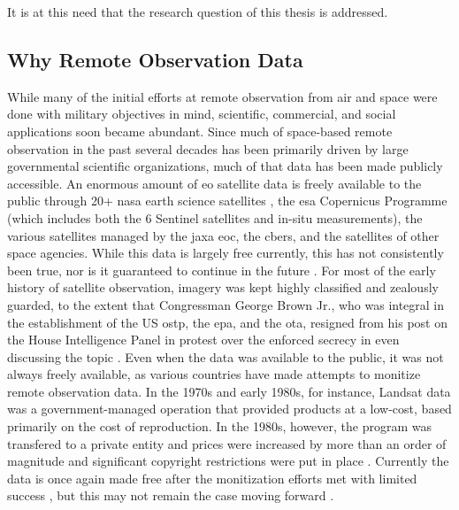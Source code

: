 It is at this need that the research question of this thesis is addressed.


\subsection{Why Remote Observation Data} \label{sec:remote}


While many of the initial efforts at remote observation from air and space were done with military objectives in mind, scientific, commercial, and social applications soon became abundant. Since much of space-based remote observation in the past several decades has been primarily driven by large governmental scientific organizations, much of that data has been made publicly accessible. An enormous amount of \ac{eo} satellite data is freely available to the public through 20+ \ac{nasa} earth science satellites \cite{shirahNASAEarthObserving2017}, the \ac{esa} Copernicus Programme (which includes both the 6 Sentinel satellites and in-situ measurements), the various satellites managed by the \ac{jaxa} \ac{eoc}, the \ac{cbers}, and the satellites of other space agencies. While this data is largely free currently, this has not consistently been true, nor is it guaranteed to continue in the future \cite{borowitzOpenSpaceGlobal2017}. For most of the early history of satellite observation, imagery was kept highly classified and zealously guarded, to the extent that Congressman George Brown Jr., who was integral in the establishment of the US \ac{ostp}, the \ac{epa}, and the \ac{ota}, resigned from his post on the House Intelligence Panel in protest over the enforced secrecy in even discussing the topic \cite{healyRepBrownQuits1987, barry1992mappings}. Even when the data was available to the public, it was not always freely available, as various countries have made attempts to monitize remote observation data. In the 1970s and early 1980s, for instance, Landsat data was a government-managed operation that provided products at a low-cost, based primarily on the cost of reproduction. In the 1980s, however, the program was transfered to a private entity and prices were increased by more than an order of magnitude and significant copyright restrictions were put in place \cite{mchaffieManufacturingMetaphors1994}. Currently the data is once again made free after the monitization efforts met with limited success \cite{waldropLandsatCommercializationStumbles1987}, but this may not remain the case moving forward \cite{popkinUSGovernmentConsiders2018}.

